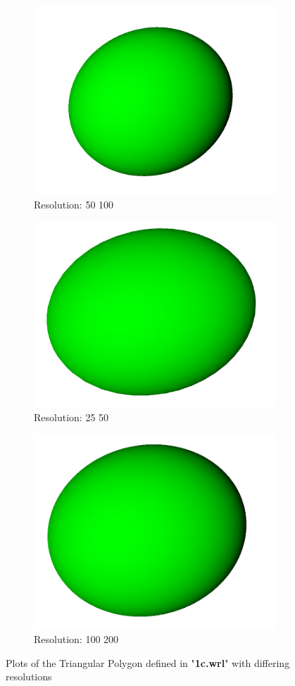 \documentclass[acmlarge,nonacm=true]{acmart}
\begin{document}
\begin{figure}[H]
	\begin{subfigure}{.33\textwidth}
	  \centering
	  \includegraphics[width=.8\linewidth]{fig/1c50_100}
	  \caption{Resolution: 50 100}
	\end{subfigure}%
	\begin{subfigure}{.33\textwidth}
	  \centering
	  \includegraphics[width=.8\linewidth]{fig/1c25_50}
	  \caption{Resolution: 25 50}
	\end{subfigure}
	\begin{subfigure}{.33\textwidth}
		\centering
		\includegraphics[width=.8\linewidth]{fig/1c100_200}
		\caption{Resolution: 100 200}
	  \end{subfigure}
	\caption{Plots of the Triangular Polygon defined in "\textbf{1c.wrl}" with differing resolutions}
	\label{fig:1c}
\end{figure}
\end{document}

